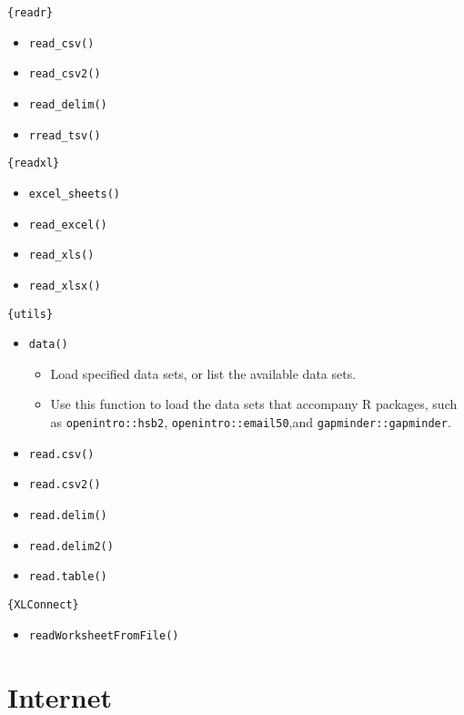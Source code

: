 \documentclass[
]{book}
\providecommand{\tightlist}{%
  \setlength{\itemsep}{0pt}\setlength{\parskip}{0pt}}
\begin{document}
\texttt{\{readr\}}

\begin{itemize}
\tightlist
\item
  \texttt{read\_csv()}
\item
  \texttt{read\_csv2()}
\item
  \texttt{read\_delim()}
\item
  \texttt{rread\_tsv()}
\end{itemize}

\texttt{\{readxl\}}

\begin{itemize}
\tightlist
\item
  \texttt{excel\_sheets()}
\item
  \texttt{read\_excel()}
\item
  \texttt{read\_xls()}
\item
  \texttt{read\_xlsx()}
\end{itemize}

\texttt{\{utils\}}

\begin{itemize}
\tightlist
\item
  \texttt{data()}

  \begin{itemize}
  \tightlist
  \item
    Load specified data sets, or list the available data sets.
  \item
    Use this function to load the data sets that accompany R packages, such as \texttt{openintro::hsb2}, \texttt{openintro::email50},and \texttt{gapminder::gapminder}.
  \end{itemize}
\item
  \texttt{read.csv()}
\item
  \texttt{read.csv2()}
\item
  \texttt{read.delim()}
\item
  \texttt{read.delim2()}
\item
  \texttt{read.table()}
\end{itemize}

\texttt{\{XLConnect\}}

\begin{itemize}
\tightlist
\item
  \texttt{readWorksheetFromFile()}
\end{itemize}

\hypertarget{internet}{%
\section{Internet}\label{internet}}
\end{document}
